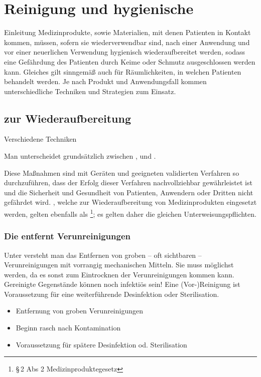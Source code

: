 


\clearpage
\section{Reinigung und hygienische }

\Text
{Einleitung}%
{%
Medizinprodukte, sowie Materialien, mit denen Patienten in Kontakt kommen, müssen, sofern sie wiederverwendbar sind, nach einer Anwendung und vor einer neuerlichen Verwendung hygienisch wiederaufbereitet werden, sodass eine Gefährdung des Patienten durch Keime oder Schmutz ausgeschlossen werden kann. Gleiches gilt sinngemäß auch für Räumlichkeiten, in welchen Patienten behandelt werden. Je nach Produkt und Anwendungsfall kommen unterschiedliche Techniken und Strategien zum Einsatz. }%




\subsection{ zur Wiederaufbereitung}

\Text
{Verschiedene Techniken}%
{%
Man unterscheidet grundsätzlich zwischen ,  und 
.

Diese Maßnahmen sind
mit Geräten und geeigneten validierten Verfahren so
durchzuführen, dass der Erfolg dieser Verfahren
nachvollziehbar gewährleistet ist und die Sicherheit und
Gesundheit von Patienten, Anwendern oder Dritten nicht
gefährdet wird. , welche zur
Wiederaufbereitung von Medizinprodukten eingesetzt werden,
gelten ebenfalls als \footnote{{\S}\,2 Abs
2 Medizinproduktegesetz}; es gelten daher die gleichen
Unterweisungspflichten.}%



\subsubsection{Die  entfernt Verunreinigungen}

{%
Unter  versteht man das Entfernen von groben --
oft sichtbaren -- Verunreinigungen mit vorrangig
mechanischen Mitteln. Sie muss möglichst  werden, da es sonst zum Eintrocknen
der Verunreinigungen kommen kann. Gereinigte Gegenstände
können noch infektiös sein!
Eine (Vor-)Reinigung ist Voraussetzung für eine
weiterführende Desinfektion oder Sterilisation.
}{
\begin{itemize}
  \item Entfernung von groben Verunreinigungen
  \item Beginn rasch nach Kontamination
  \item Voraussetzung für spätere Desinfektion od.
  Sterilisation
\end{itemize}
}{}{}{}




